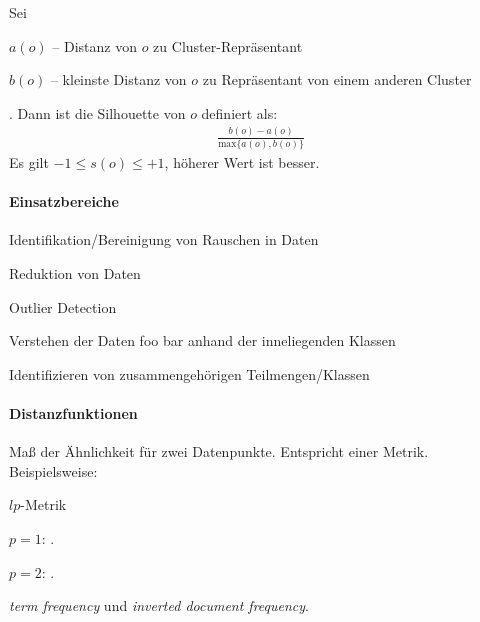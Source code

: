 \documentclass[10pt]{article} %
\begin{document}
 \begin{definition} 
    Sei
    \begin{cptitemize} 
         \item $a(o)$ -- Distanz von $o$ zu Cluster-Repräsentant
         \item $b(o)$ -- kleinste Distanz von $o$ zu Repräsentant von einem anderen Cluster
    \end{cptitemize}. Dann ist die Silhouette von $o$ definiert als:
    \begin{align*} 
       \frac{b(o)-a(o)}{\text{max}\{a(o),b(o)\}} 
    \end{align*} 
    Es gilt $-1 \leq s(o) \leq +1$, höherer Wert ist besser.
 \end{definition} 


\paragraph{Einsatzbereiche} 
\begin{cptitemize} 
   \item Identifikation/Bereinigung von Rauschen in Daten
   \item Reduktion von Daten
   \item Outlier Detection
   \item Verstehen der Daten foo bar anhand der inneliegenden Klassen
   \item Identifizieren von zusammengehörigen Teilmengen/Klassen 
\end{cptitemize} 

\paragraph{Distanzfunktionen} Maß der Ähnlichkeit für zwei Datenpunkte. Entspricht einer Metrik. Beispielsweise:
\begin{cptitemize} 
      \item $lp$-Metrik
      \begin{cptitemize} 
        	 \item $p=1$: \textbf{} .
        	 \item $p=2$: \textbf{} .
       \end{cptitemize}  
      \item \textit{term frequency} und \textit{inverted document frequency}.
 \end{cptitemize}   
\end{document}
